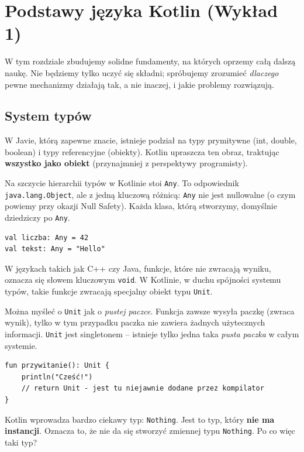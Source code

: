 \chapter{Podstawy języka Kotlin (Wykład 1)}

W tym rozdziale zbudujemy solidne fundamenty, na których oprzemy całą dalszą naukę. Nie będziemy tylko uczyć się składni; spróbujemy zrozumieć \textit{dlaczego} pewne mechanizmy działają tak, a nie inaczej, i jakie problemy rozwiązują.

\section{System typów}

W Javie, którą zapewne znacie, istnieje podział na typy prymitywne (int, double, boolean) i typy referencyjne (obiekty). Kotlin upraszcza ten obraz, traktując \textbf{wszystko jako obiekt} (przynajmniej z perspektywy programisty).

Na szczycie hierarchii typów w Kotlinie stoi \texttt{Any}. To odpowiednik \texttt{java.lang.Object}, ale z jedną kluczową różnicą: \texttt{Any} nie jest nullowalne (o czym powiemy przy okazji Null Safety). Każda klasa, którą stworzymy, domyślnie dziedziczy po \texttt{Any}.

\begin{verbatim}
val liczba: Any = 42
val tekst: Any = "Hello"
\end{verbatim}

W językach takich jak C++ czy Java, funkcje, które nie zwracają wyniku, oznacza się słowem kluczowym \texttt{void}. W Kotlinie, w duchu spójności systemu typów, takie funkcje zwracają specjalny obiekt typu \texttt{Unit}.

Można myśleć o \texttt{Unit} jak o \textit{pustej paczce}. Funkcja zawsze wysyła paczkę (zwraca wynik), tylko w tym przypadku paczka nie zawiera żadnych użytecznych informacji. \texttt{Unit} jest singletonem – istnieje tylko jedna taka \textit{pusta paczka} w całym systemie.

\begin{verbatim}
fun przywitanie(): Unit {
    println("Cześć!")
    // return Unit - jest tu niejawnie dodane przez kompilator
}
\end{verbatim}

Kotlin wprowadza bardzo ciekawy typ: \texttt{Nothing}. Jest to typ, który \textbf{nie ma instancji}. Oznacza to, że nie da się stworzyć zmiennej typu \texttt{Nothing}. Po co więc taki typ?

